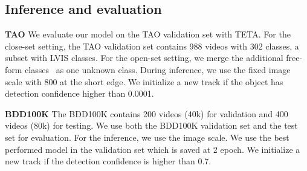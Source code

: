 \documentclass[runningheads]{llncs}
\newcommand{\parsection}[1]{\vspace{1mm}\noindent\textbf{#1 }}
\begin{document}
\subsection{Inference and evaluation}

\parsection{TAO}
We evaluate our model on the TAO validation set with TETA. For the close-set setting, the TAO validation set contains 988 videos with 302 classes, a subset with LVIS classes. For the open-set setting, we merge the additional free-form classes~\cite{tao} as one unknown class. During inference, we use the fixed image scale with 800 at the short edge. We initialize a new track if the object has detection confidence higher than 0.0001.  

\parsection{BDD100K}
The BDD100K contains 200 videos (40k) for validation and 400 videos (80k) for testing. We use both the BDD100K validation set and the test set for evaluation. For the inference, we use the  image scale. We use the best performed model in the validation set which is saved at 2 epoch. We initialize a new track if the detection confidence is higher than 0.7. 




\end{document}
